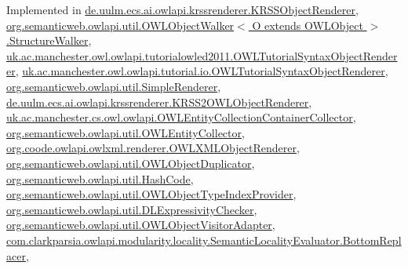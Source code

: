 Implemented in \hyperlink{classde_1_1uulm_1_1ecs_1_1ai_1_1owlapi_1_1krssrenderer_1_1_k_r_s_s_object_renderer_a8508a4e5cd2de22b2882d82a44c1a35b}{de.\-uulm.\-ecs.\-ai.\-owlapi.\-krssrenderer.\-K\-R\-S\-S\-Object\-Renderer}, \hyperlink{classorg_1_1semanticweb_1_1owlapi_1_1util_1_1_o_w_l_object_walker_3_01_o_01extends_01_o_w_l_object_01_4_1_1_structure_walker_a319d8ff1b5dd76773a5aa135d4873d7f}{org.\-semanticweb.\-owlapi.\-util.\-O\-W\-L\-Object\-Walker$<$ O extends O\-W\-L\-Object $>$.\-Structure\-Walker}, \hyperlink{classuk_1_1ac_1_1manchester_1_1owl_1_1owlapi_1_1tutorialowled2011_1_1_o_w_l_tutorial_syntax_object_renderer_ada0ca173f36d166912e14e8826b65334}{uk.\-ac.\-manchester.\-owl.\-owlapi.\-tutorialowled2011.\-O\-W\-L\-Tutorial\-Syntax\-Object\-Renderer}, \hyperlink{classuk_1_1ac_1_1manchester_1_1owl_1_1owlapi_1_1tutorial_1_1io_1_1_o_w_l_tutorial_syntax_object_renderer_abf362077f0c8a1b6f085d7196c2e2c83}{uk.\-ac.\-manchester.\-owl.\-owlapi.\-tutorial.\-io.\-O\-W\-L\-Tutorial\-Syntax\-Object\-Renderer}, \hyperlink{classorg_1_1semanticweb_1_1owlapi_1_1util_1_1_simple_renderer_aa826f4c41f8bf9e9a387eab28e4921e1}{org.\-semanticweb.\-owlapi.\-util.\-Simple\-Renderer}, \hyperlink{classde_1_1uulm_1_1ecs_1_1ai_1_1owlapi_1_1krssrenderer_1_1_k_r_s_s2_o_w_l_object_renderer_ac1e16621ff10a65453f0ed6265ab18eb}{de.\-uulm.\-ecs.\-ai.\-owlapi.\-krssrenderer.\-K\-R\-S\-S2\-O\-W\-L\-Object\-Renderer}, \hyperlink{classuk_1_1ac_1_1manchester_1_1cs_1_1owl_1_1owlapi_1_1_o_w_l_entity_collection_container_collector_a6f56680c3e0313a2b76a817370cd685c}{uk.\-ac.\-manchester.\-cs.\-owl.\-owlapi.\-O\-W\-L\-Entity\-Collection\-Container\-Collector}, \hyperlink{classorg_1_1semanticweb_1_1owlapi_1_1util_1_1_o_w_l_entity_collector_adf646692f0b32729e84c948e8ba19138}{org.\-semanticweb.\-owlapi.\-util.\-O\-W\-L\-Entity\-Collector}, \hyperlink{classorg_1_1coode_1_1owlapi_1_1owlxml_1_1renderer_1_1_o_w_l_x_m_l_object_renderer_a58ee0fda36cc2cc41932d652a9d68c8c}{org.\-coode.\-owlapi.\-owlxml.\-renderer.\-O\-W\-L\-X\-M\-L\-Object\-Renderer}, \hyperlink{classorg_1_1semanticweb_1_1owlapi_1_1util_1_1_o_w_l_object_duplicator_a4da61fb96c29474c37e1792b8ebf9e6c}{org.\-semanticweb.\-owlapi.\-util.\-O\-W\-L\-Object\-Duplicator}, \hyperlink{classorg_1_1semanticweb_1_1owlapi_1_1util_1_1_hash_code_a64d149ec539bbc228e578948769c9218}{org.\-semanticweb.\-owlapi.\-util.\-Hash\-Code}, \hyperlink{classorg_1_1semanticweb_1_1owlapi_1_1util_1_1_o_w_l_object_type_index_provider_a9dcf07dc19a0808ee78c7258f004f767}{org.\-semanticweb.\-owlapi.\-util.\-O\-W\-L\-Object\-Type\-Index\-Provider}, \hyperlink{classorg_1_1semanticweb_1_1owlapi_1_1util_1_1_d_l_expressivity_checker_a7e2a60aff7737dad6fad8a28cf1393fe}{org.\-semanticweb.\-owlapi.\-util.\-D\-L\-Expressivity\-Checker}, \hyperlink{classorg_1_1semanticweb_1_1owlapi_1_1util_1_1_o_w_l_object_visitor_adapter_a9eaac82502a4ce5b036e0503cece23f2}{org.\-semanticweb.\-owlapi.\-util.\-O\-W\-L\-Object\-Visitor\-Adapter}, \hyperlink{classcom_1_1clarkparsia_1_1owlapi_1_1modularity_1_1locality_1_1_semantic_locality_evaluator_1_1_bottom_replacer_ad7b3e4425bb6bbe87d431fd70c5a21ba}{com.\-clarkparsia.\-owlapi.\-modularity.\-locality.\-Semantic\-Locality\-Evaluator.\-Bottom\-Replacer}, 